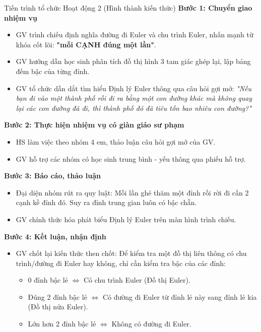 \documentclass[12pt, a4paper]{article}
\begin{document}
\begin{pedabox}{Tiến trình tổ chức Hoạt động 2 (Hình thành kiến thức)}
    \textbf{Bước 1: Chuyển giao nhiệm vụ}
    \begin{itemize}[leftmargin=0.6cm]
        \item GV trình chiếu định nghĩa đường đi Euler và chu trình Euler, nhấn mạnh từ khóa cốt lõi: \textbf{"mỗi CẠNH đúng một lần"}.
        \item GV hướng dẫn học sinh phân tích đồ thị hình 3 tam giác ghép lại, lập bảng đếm bậc của từng đỉnh.
        \item GV tổ chức dẫn dắt tìm hiểu Định lý Euler thông qua câu hỏi gợi mở: \textit{"Nếu bạn đi vào một thành phố rồi đi ra bằng một con đường khác mà không quay lại các con đường đã đi, thì thành phố đó đã tiêu tốn bao nhiêu con đường?"}
    \end{itemize}

    \textbf{Bước 2: Thực hiện nhiệm vụ có giàn giáo sư phạm}
    \begin{itemize}[leftmargin=0.6cm]
        \item HS làm việc theo nhóm 4 em, thảo luận câu hỏi gợi mở của GV.
        \item GV hỗ trợ các nhóm có học sinh trung bình - yếu thông qua phiếu hỗ trợ.
    \end{itemize}

    \textbf{Bước 3: Báo cáo, thảo luận}
    \begin{itemize}[leftmargin=0.6cm]
        \item Đại diện nhóm rút ra quy luật: Mỗi lần ghé thăm một đỉnh rồi rời đi cần 2 cạnh kề đỉnh đó. Suy ra đỉnh trung gian luôn có bậc chẵn.
        \item GV chính thức hóa phát biểu Định lý Euler trên màn hình trình chiếu.
    \end{itemize}

    \textbf{Bước 4: Kết luận, nhận định}
    \begin{itemize}[leftmargin=0.6cm]
        \item GV chốt lại kiến thức then chốt: Để kiểm tra một đồ thị liên thông có chu trình/đường đi Euler hay không, chỉ cần kiểm tra bậc của các đỉnh:
        \begin{itemize}
            \item 0 đỉnh bậc lẻ $\iff$ Có chu trình Euler (Đồ thị Euler).
            \item Đúng 2 đỉnh bậc lẻ $\iff$ Có đường đi Euler từ đỉnh lẻ này sang đỉnh lẻ kia (Đồ thị nửa Euler).
            \item Lớn hơn 2 đỉnh bậc lẻ $\iff$ Không có đường đi Euler.
        \end{itemize}
    \end{itemize}
\end{pedabox}
\end{document}
